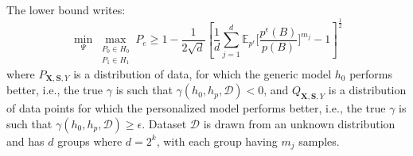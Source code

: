 \begin{theorem}\label{th:lower_bound_any_prob}
The lower bound writes:
\begin{equation}
    \min _{\Psi} 
    \max _{\substack{P_0 \in H_0 \\ P_1 \in H_1}}
        P_e 
        \geq 1 - \frac{1}{2\sqrt{d}}\left[
             \frac{1}{d}
            \sum_{j=1}^d \mathbb{E}_{p^\epsilon}\Bigg[
           \frac{p^{\epsilon}(B)}{p(B)}\Bigg]^{m_j}
            -1
            \right]^{\frac{1}{2}}
\end{equation}
where $P_{\mathbf{X}, \mathbf{S}, Y}$ is a distribution of data, for which the generic model $h_0$ performs better, i.e., the true $\gamma$ is such that $\gamma(h_0, h_p, \mathcal{D}) < 0$, and $Q_{\mathbf{X}, \mathbf{S}, Y}$ is a distribution of data points for which the personalized model performs better, i.e., the true $\gamma$ is such that $\gamma(h_0, h_p, \mathcal{D}) \geq \epsilon$. Dataset $\mathcal{D}$ is drawn from an unknown distribution and has $d$ groups where $d=2^k$, with each group having $m_j$ samples.
\end{theorem}
